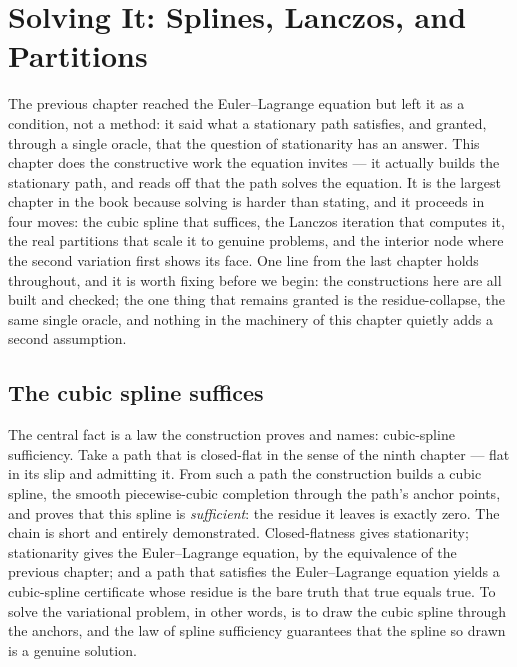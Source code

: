 \chapter{Solving It: Splines, Lanczos, and Partitions}
\label{chap:splines-lanczos-partitions}

The previous chapter reached the Euler--Lagrange equation but left it as a condition, not a method: it
said what a stationary path satisfies, and granted, through a single oracle, that the question of
stationarity has an answer. This chapter does the constructive work the equation invites --- it
actually builds the stationary path, and reads off that the path solves the equation. It is the
largest chapter in the book because solving is harder than stating, and it proceeds in four moves: the
cubic spline that suffices, the Lanczos iteration that computes it, the real partitions that scale it
to genuine problems, and the interior node where the second variation first shows its face. One line
from the last chapter holds throughout, and it is worth fixing before we begin: the constructions here
are all built and checked; the one thing that remains granted is the residue-collapse, the same single
oracle, and nothing in the machinery of this chapter quietly adds a second assumption.

\section{The cubic spline suffices}
\label{se:the-cubic-spline-suffices}

The central fact is a law the construction proves and names: cubic-spline sufficiency. Take a path
that is closed-flat in the sense of the ninth chapter --- flat in its slip and admitting it. From such
a path the construction builds a cubic spline, the smooth piecewise-cubic completion through the path's
anchor points, and proves that this spline is \emph{sufficient}: the residue it leaves is exactly zero.
The chain is short and entirely demonstrated. Closed-flatness gives stationarity; stationarity gives
the Euler--Lagrange equation, by the equivalence of the previous chapter; and a path that satisfies the
Euler--Lagrange equation yields a cubic-spline certificate whose residue is the bare truth that true
equals true. To solve the variational problem, in other words, is to draw the cubic spline through the
anchors, and the law of spline sufficiency guarantees that the spline so drawn is a genuine solution.

